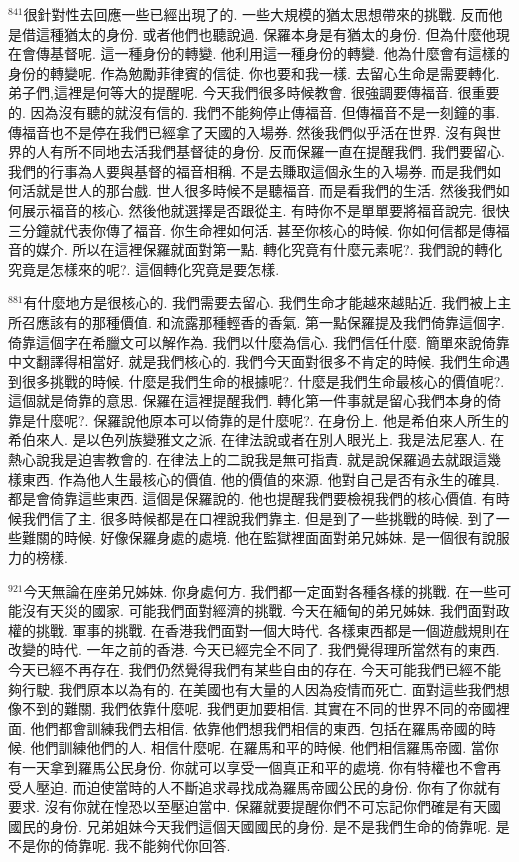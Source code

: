 \documentclass{book}
\begin{document}
$^{841}$很針對性去回應一些已經出現了的.
一些大規模的猶太思想帶來的挑戰.
反而他是借這種猶太的身份.
或者他們也聽說過.
保羅本身是有猶太的身份.
但為什麼他現在會傳基督呢.
這一種身份的轉變.
他利用這一種身份的轉變.
他為什麼會有這樣的身份的轉變呢.
作為勉勵菲律賓的信徒.
你也要和我一樣.
去留心生命是需要轉化.
弟子們,這裡是何等大的提醒呢.
今天我們很多時候教會.
很強調要傳福音.
很重要的.
因為沒有聽的就沒有信的.
我們不能夠停止傳福音.
但傳福音不是一刻鐘的事.
傳福音也不是停在我們已經拿了天國的入場券.
然後我們似乎活在世界.
沒有與世界的人有所不同地去活我們基督徒的身份.
反而保羅一直在提醒我們.
我們要留心.
我們的行事為人要與基督的福音相稱.
不是去賺取這個永生的入場券.
而是我們如何活就是世人的那台戲.
世人很多時候不是聽福音.
而是看我們的生活.
然後我們如何展示福音的核心.
然後他就選擇是否跟從主.
有時你不是單單要將福音說完.
很快三分鐘就代表你傳了福音.
你生命裡如何活.
甚至你核心的時候.
你如何信都是傳福音的媒介.
所以在這裡保羅就面對第一點.
轉化究竟有什麼元素呢?.
我們說的轉化究竟是怎樣來的呢?.
這個轉化究竟是要怎樣.

$^{881}$有什麼地方是很核心的.
我們需要去留心.
我們生命才能越來越貼近.
我們被上主所召應該有的那種價值.
和流露那種輕香的香氣.
第一點保羅提及我們倚靠這個字.
倚靠這個字在希臘文可以解作為.
我們以什麼為信心.
我們信任什麼.
簡單來說倚靠中文翻譯得相當好.
就是我們核心的.
我們今天面對很多不肯定的時候.
我們生命遇到很多挑戰的時候.
什麼是我們生命的根據呢?.
什麼是我們生命最核心的價值呢?.
這個就是倚靠的意思.
保羅在這裡提醒我們.
轉化第一件事就是留心我們本身的倚靠是什麼呢?.
保羅說他原本可以倚靠的是什麼呢?.
在身份上.
他是希伯來人所生的希伯來人.
是以色列族變雅文之派.
在律法說或者在別人眼光上.
我是法尼塞人.
在熱心說我是迫害教會的.
在律法上的二說我是無可指責.
就是說保羅過去就跟這幾樣東西.
作為他人生最核心的價值.
他的價值的來源.
他對自己是否有永生的確具.
都是會倚靠這些東西.
這個是保羅說的.
他也提醒我們要檢視我們的核心價值.
有時候我們信了主.
很多時候都是在口裡說我們靠主.
但是到了一些挑戰的時候.
到了一些難關的時候.
好像保羅身處的處境.
他在監獄裡面面對弟兄姊妹.
是一個很有說服力的榜樣.

$^{921}$今天無論在座弟兄姊妹.
你身處何方.
我們都一定面對各種各樣的挑戰.
在一些可能沒有天災的國家.
可能我們面對經濟的挑戰.
今天在緬甸的弟兄姊妹.
我們面對政權的挑戰.
軍事的挑戰.
在香港我們面對一個大時代.
各樣東西都是一個遊戲規則在改變的時代.
一年之前的香港.
今天已經完全不同了.
我們覺得理所當然有的東西.
今天已經不再存在.
我們仍然覺得我們有某些自由的存在.
今天可能我們已經不能夠行駛.
我們原本以為有的.
在美國也有大量的人因為疫情而死亡.
面對這些我們想像不到的難關.
我們依靠什麼呢.
我們更加要相信.
其實在不同的世界不同的帝國裡面.
他們都會訓練我們去相信.
依靠他們想我們相信的東西.
包括在羅馬帝國的時候.
他們訓練他們的人.
相信什麼呢.
在羅馬和平的時候.
他們相信羅馬帝國.
當你有一天拿到羅馬公民身份.
你就可以享受一個真正和平的處境.
你有特權也不會再受人壓迫.
而迫使當時的人不斷追求尋找成為羅馬帝國公民的身份.
你有了你就有要求.
沒有你就在惶恐以至壓迫當中.
保羅就要提醒你們不可忘記你們確是有天國國民的身份.
兄弟姐妹今天我們這個天國國民的身份.
是不是我們生命的倚靠呢.
是不是你的倚靠呢.
我不能夠代你回答.
\end{document}
